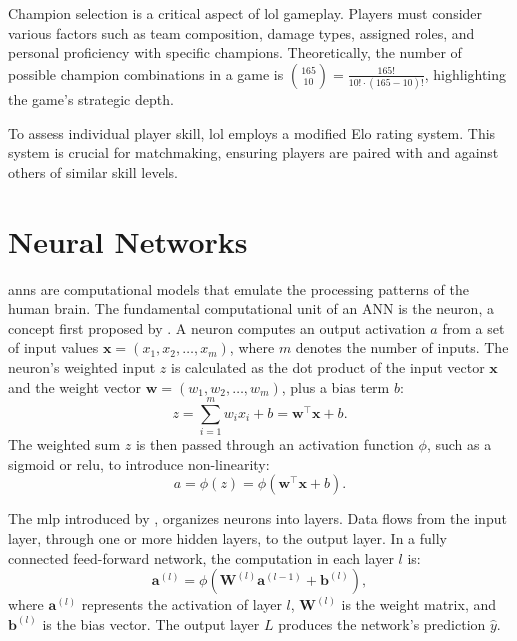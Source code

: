\documentclass[12pt, a4paper, headinclude, twoside, plainheadsepline, open=right, numbers=noenddot, hidelinks, toc=listof, toc=bibliography]{scrreprt}
\begin{document}
Champion selection is a critical aspect of \ac{lol} gameplay. 
Players must consider various factors such as team composition, damage types, assigned roles, and personal proficiency with specific champions. 
Theoretically, the number of possible champion combinations in a game is $\binom{165}{10} = \frac{165!}{10! \cdot (165-10)!}$, highlighting the game's strategic depth.

To assess individual player skill, \ac{lol} employs a modified Elo rating system. This system is crucial for matchmaking, ensuring players are paired with and against others of similar skill levels.


\section{Neural Networks}
\label{sec:nn}

\Acp{ann} are computational models that emulate the processing patterns of the human brain. The fundamental computational unit of an ANN is the neuron, a concept first proposed by \citeauthor{mccullochLogicalCalculusIdeas1943} \cite{mccullochLogicalCalculusIdeas1943}. 
A neuron computes an output activation $a$ from a set of input values $\mathbf{x} = (x_1, x_2, \ldots, x_m)$, where $m$ denotes the number of inputs. 
The neuron's weighted input $z$ is calculated as the dot product of the input vector $\mathbf{x}$ and the weight vector $\mathbf{w} = (w_1, w_2, \ldots, w_m)$, plus a bias term $b$:
\begin{equation}
z = \sum_{i=1}^{m} w_i x_i + b = \mathbf{w}^\top \mathbf{x} + b.
\end{equation}
The weighted sum $z$ is then passed through an activation function $\phi$, such as a sigmoid or \ac{relu}, to introduce non-linearity:
\begin{equation}
a = \phi(z) = \phi(\mathbf{w}^\top \mathbf{x} + b).
\end{equation}

The \ac{mlp} introduced by \citeauthor{rosenblattPerceptronProbabilisticModel1958} \cite{rosenblattPerceptronProbabilisticModel1958}, organizes neurons into layers. 
Data flows from the input layer, through one or more hidden layers, to the output layer. In a fully connected feed-forward network, the computation in each layer $l$ is:
\begin{equation}
\mathbf{a}^{(l)} = \phi (\mathbf{W}^{(l)} \mathbf{a}^{(l-1)} + \mathbf{b}^{(l)}),
\end{equation}
where $\mathbf{a}^{(l)}$ represents the activation of layer $l$, $\mathbf{W}^{(l)}$ is the weight matrix, and $\mathbf{b}^{(l)}$ is the bias vector. 
The output layer $L$ produces the network's prediction $\hat{y}$.
\end{document}
